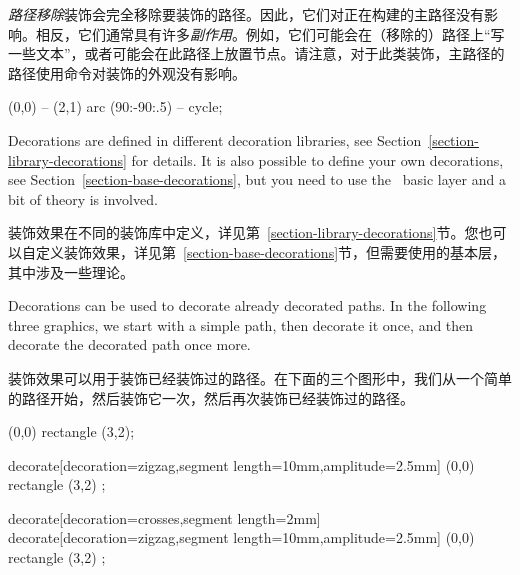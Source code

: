 \begin{enumerate}
        \emph{路径移除}装饰会完全移除要装饰的路径。因此，它们对正在构建的主路径没有影响。相反，它们通常具有许多\emph{副作用}。例如，它们可能会在（移除的）路径上“写一些文本”，或者可能会在此路径上放置节点。请注意，对于此类装饰，主路径的路径使用命令对装饰的外观没有影响。
\begin{codeexample}[preamble={\usetikzlibrary{decorations.text}}]
\tikz \fill [decorate,decoration={text along path,
               text=This is a text along a path. Note how the path is lost.}]
  [fill=blue!20,draw=blue,thick] (0,0) -- (2,1) arc (90:-90:.5) -- cycle;
\end{codeexample}
\end{enumerate}

Decorations are defined in different decoration libraries, see
Section~\ref{section-library-decorations} for details. It is also possible to
define your own decorations, see Section~\ref{section-base-decorations}, but
you need to use the \pgfname\ basic layer and a bit of theory is involved.

装饰效果在不同的装饰库中定义，详见第~\ref{section-library-decorations}节。您也可以自定义装饰效果，详见第~\ref{section-base-decorations}节，但需要使用\pgfname 的基本层，其中涉及一些理论。

Decorations can be used to decorate already decorated paths. In the following
three graphics, we start with a simple path, then decorate it once, and then
decorate the decorated path once more.

装饰效果可以用于装饰已经装饰过的路径。在下面的三个图形中，我们从一个简单的路径开始，然后装饰它一次，然后再次装饰已经装饰过的路径。

%
\begin{codeexample}[]
\tikz \fill [fill=blue!20,draw=blue,thick]
  (0,0) rectangle (3,2);
\end{codeexample}
%
\begin{codeexample}[preamble={\usetikzlibrary{decorations.pathmorphing}}]
\tikz \fill [fill=blue!20,draw=blue,thick]
  decorate[decoration={zigzag,segment length=10mm,amplitude=2.5mm}]
    { (0,0) rectangle (3,2) };
\end{codeexample}
%
\begin{codeexample}[preamble={\usetikzlibrary{
    decorations.pathmorphing,
    decorations.shapes,
}}]
\tikz \fill [fill=blue!20,draw=blue,thick]
  decorate[decoration={crosses,segment length=2mm}] {
    decorate[decoration={zigzag,segment length=10mm,amplitude=2.5mm}] {
      (0,0) rectangle (3,2)
    }
  };
\end{codeexample}

